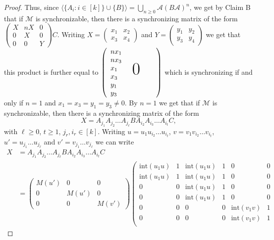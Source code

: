 \documentclass[submission,copyright,creativecommons]{eptcs}
\theoremstyle{plain}
\theoremstyle{definition}
\theoremstyle{remark}
\begin{document}
\begin{proof}
Thus, since $\langle\{A_i:i\in[k]\}\cup\{B\}\rangle=\mathop\bigcup\limits_{n\geq 0}\mathcal{A}(B\mathcal{A})^n$, we get by Claim B that
if $\mathcal{M}$ is synchronizable, then there is a synchronizing matrix of the form $\left(\begin{array}{lll}X&nX&0\\0&X&0\\0&0&Y\end{array}\right)C$.
Writing $X=\left(\begin{array}{ll}x_1&x_2\\x_3&x_4\end{array}\right)$ and
$Y=\left(\begin{array}{ll}y_1&y_2\\y_3&y_4\end{array}\right)$ we get that this product is further equal to
$\left(\begin{array}{l}nx_1\\nx_3\\x_1\\x_3\\y_1\\y_3\end{array}\textrm{\quad\Huge{$0$}\quad}\right)$ which is synchronizing if and only if
$n=1$ and $x_1=x_3=y_1=y_3\neq 0$. By $n=1$ we get that if $\mathcal{M}$ is synchronizable, then there is a synchronizing matrix of the form
\[X=A_{j_1}A_{j_2}\ldots A_{j_\ell}BA_{i_2}A_{i_3}\ldots A_{i_t}C,\]
with $\ell\geq 0$, $t\geq 1$, $j_r,i_r\in[k]$.
Writing $u=u_1u_{i_2}\ldots u_{i_t}$, $v=v_1v_{i_2}\ldots v_{i_t}$, $u'=u_{j_1}\ldots u_{j_\ell}$ and $v'=v_{j_1}\ldots v_{j_\ell}$
we can write
\begin{align*}
X&=A_{j_1}A_{j_2}\ldots A_{j_\ell}BA_{i_2}A_{i_3}\ldots A_{i_t}C\\
&=
  \left(\begin{array}{lll}M(u')&0&0\\0&M(u')&0\\0&0&M(v')\end{array}\right)
  \left(\begin{array}{llllll}
  \mathrm{int}(u_1u)&1&\mathrm{int}(u_1u)&1&0&0\\
  \mathrm{int}(u_1u)&1&\mathrm{int}(u_1u)&1&0&0\\
  0&0&\mathrm{int}(u_1u)&1&0&0\\
  0&0&\mathrm{int}(u_1u)&1&0&0\\
  0&0&0&0&\mathrm{int}(v_1v)&1\\
  0&0&0&0&\mathrm{int}(v_1v)&1\\

\end{array}
\end{align*}
\end{proof}
\end{document}
